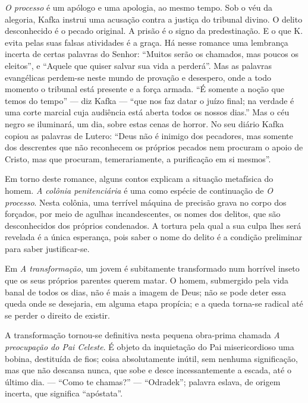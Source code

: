 \textit{O processo} é um apólogo e uma apologia, ao mesmo tempo. Sob o véu da
alegoria, Kafka instrui uma acusação contra a justiça do tribunal
divino. O delito desconhecido é o pecado original. A prisão é o signo da
predestinação. E o que K.
evita pelas suas falsas atividades é a graça. Há nesse romance uma
lembrança incerta de certas palavras do Senhor: ``Muitos serão os
chamados, mas poucos os eleitos'', e ``Aquele que quiser salvar sua vida
a perderá''. Mas as palavras evangélicas perdem-se neste mundo de
provação e desespero, onde a todo momento o
tribunal está presente e a força armada. ``É somente a noção que temos
do tempo'' --- diz Kafka --- ``que nos faz datar o juízo final; na verdade é uma corte
  marcial cuja audiência está aberta todos os nossos dias.'' Mas o céu
  negro se iluminará, um dia, sobre estas cenas de horror. No seu diário
  Kafka copiou as palavras de Lutero: ``Deus não é inimigo dos
  pecadores, mas somente dos descrentes que não reconhecem os próprios
  pecados nem procuram o apoio de Cristo, mas que procuram,
  temerariamente, a purificação em si mesmos''.

Em torno deste romance, alguns contos explicam a situação metafísica do homem. \textit{A colônia penitenciária} é uma como espécie de continuação de \textit{O
processo}. Nesta colônia, uma terrível máquina de precisão grava no corpo
dos forçados, por meio de agulhas incandescentes, os nomes dos delitos,
que são desconhecidos dos próprios condenados. A tortura pela qual a sua culpa lhes será revelada
é a única esperança, pois saber o nome do delito é a condição preliminar para
saber justificar-se.

Em \textit{A transformação}, um jovem é subitamente transformado num horrível inseto que os seus próprios parentes querem matar. O homem, submergido
pela vida banal de todos os dias, não é mais a imagem de Deus; não se
pode deter essa queda onde se desejaria, em alguma etapa propícia; e a queda torna-se radical até se perder o direito de existir.

A transformação tornou-se definitiva nesta pequena obra-prima chamada \textit{A preocupação do Pai Celeste}. É objeto da inquietação do Pai
misericordioso uma bobina, destituída de fios; coisa absolutamente inútil, sem nenhuma significação, mas
que não descansa nunca, que sobe e desce incessantemente a escada, até o
último dia. --- ``Como te chamas?'' --- ``Odradek''; palavra eslava, de
origem incerta, que significa ``apóstata''.

